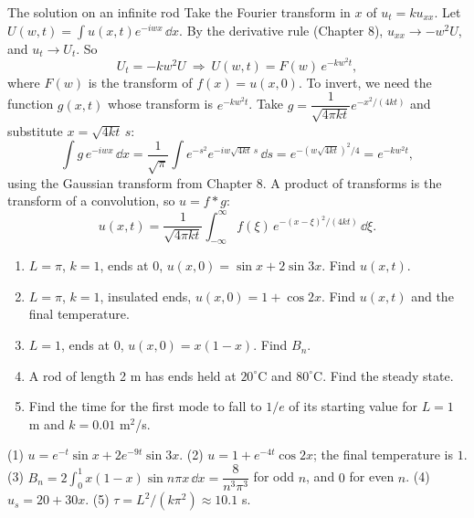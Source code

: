 \begin{derivbox}{The solution on an infinite rod}
Take the Fourier transform in $x$ of $u_t = ku_{xx}$. Let $U(w,t) = \int u(x,t)e^{-iwx}\,\dd x$. By the derivative rule (Chapter 8), $u_{xx}\to -w^2U$, and $u_t\to U_t$. So
\[ U_t = -kw^2U \ \Longrightarrow\ U(w,t) = F(w)\,e^{-kw^2t}, \]
where $F(w)$ is the transform of $f(x) = u(x,0)$. To invert, we need the function $g(x,t)$ whose transform is $e^{-kw^2t}$. Take $g = \dfrac{1}{\sqrt{4\pi kt}}e^{-x^2/(4kt)}$ and substitute $x = \sqrt{4kt}\,s$:
\[ \int g\,e^{-iwx}\,\dd x = \frac1{\sqrt\pi}\int e^{-s^2}e^{-iw\sqrt{4kt}\,s}\,\dd s = e^{-(w\sqrt{4kt})^2/4} = e^{-kw^2t}, \]
using the Gaussian transform from Chapter 8. A product of transforms is the transform of a convolution, so $u = f*g$:
\[ u(x,t) = \frac{1}{\sqrt{4\pi kt}}\int_{-\infty}^{\infty}f(\xi)\,e^{-(x-\xi)^2/(4kt)}\,\dd\xi. \]
\end{derivbox}

\begin{practicebox}
\begin{enumerate}
  \item $L=\pi$, $k=1$, ends at $0$, $u(x,0) = \sin x + 2\sin 3x$. Find $u(x,t)$.
  \item $L=\pi$, $k=1$, insulated ends, $u(x,0) = 1 + \cos 2x$. Find $u(x,t)$ and the final temperature.
  \item $L=1$, ends at $0$, $u(x,0) = x(1-x)$. Find $B_n$.
  \item A rod of length 2 m has ends held at $20^\circ$C and $80^\circ$C. Find the steady state.
  \item Find the time for the first mode to fall to $1/e$ of its starting value for $L=1$ m and $k=0.01$ m$^2$/s.
\end{enumerate}
\end{practicebox}

\begin{answerbox}
(1) $u = e^{-t}\sin x + 2e^{-9t}\sin 3x$. \quad (2) $u = 1 + e^{-4t}\cos 2x$; the final temperature is $1$. \quad (3) $B_n = 2\displaystyle\int_0^1x(1-x)\sin n\pi x\,\dd x = \dfrac{8}{n^3\pi^3}$ for odd $n$, and $0$ for even $n$. \quad (4) $u_s = 20 + 30x$. \quad (5) $\tau = L^2/(k\pi^2) \approx 10.1$ s.
\end{answerbox}
